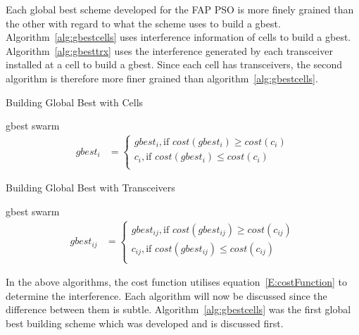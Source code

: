 Each global best scheme developed for the \gls{FAP} \gls{PSO} is more finely grained than the other with regard to what the scheme uses to build a gbest. Algorithm~\ref{alg:gbestcells} uses interference information of cells to build a gbest. Algorithm~\ref{alg:gbesttrx} uses the interference generated by each transceiver installed at a cell to build a gbest. Since each cell has transceivers, the second algorithm is therefore more finer grained than algorithm~\ref{alg:gbestcells}.

\begin{algorithm}[H]
\caption{Building Global Best with Cells}
\label{alg:gbestcells}
\begin{algorithmic}[1]
\Require gbest
\Require swarm
\begin{align}
gbest_{i}&=
    \begin{cases}
        gbest_{i} , \text{if $cost(gbest_{i}) \ge cost(c_{i})$}\\
        c_{i}, \text{if $cost(gbest_{i}) \leq cost(c_{i})$}\\
    \end{cases}
\end{align}
\EndFor
\end{algorithmic}
\end{algorithm}

\begin{algorithm}[H]
\caption{Building Global Best with Transceivers}
\label{alg:gbesttrx}
\begin{algorithmic}[1]
\Require gbest
\Require swarm
	\begin{align}
gbest_{ij}&=
    \begin{cases}
        gbest_{ij} , \text{if $cost(gbest_{ij}) \ge cost(c_{ij})$}\\
        c_{ij}, \text{if $cost(gbest_{ij}) \leq cost(c_{ij})$}\\
    \end{cases}
\end{align}
\EndFor
\end{algorithmic}
\end{algorithm}

In the above algorithms, the cost function utilises equation~\ref{E:costFunction} to determine the interference. Each algorithm will now be discussed since the difference between them is subtle. Algorithm~\ref{alg:gbestcells} was the first global best building scheme which was developed and is discussed first.


